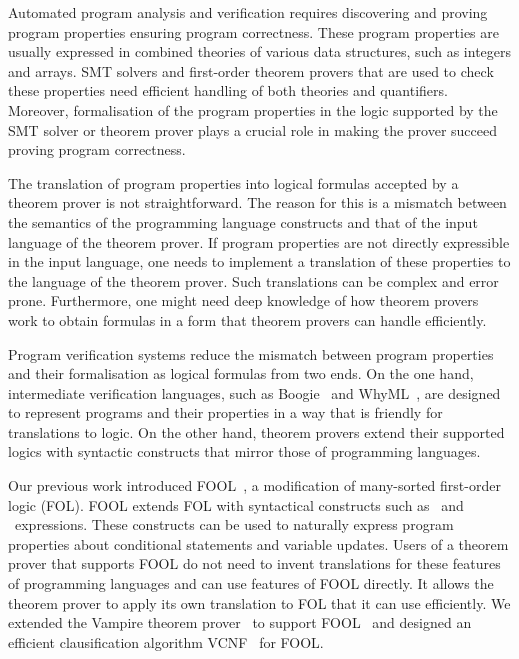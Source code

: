 
Automated program analysis and verification requires discovering and proving program properties ensuring program correctness. 
 These program properties are usually expressed in combined theories of various data structures, such as integers and arrays. 
SMT solvers and first-order theorem provers that are used to check these properties need efficient handling of both theories and quantifiers. Moreover, 
formalisation of the program properties in the logic supported by the SMT solver or theorem prover plays a crucial role in making the prover succeed proving program correctness. 

The translation of program properties into logical formulas accepted by a theorem prover is not straightforward. The reason for this is a mismatch between the semantics of the programming language constructs and that of the input language of the theorem prover. If program properties are not directly expressible in the input language, one needs to implement a translation of these properties to the language of the theorem prover. Such translations can be complex and error prone. Furthermore, one might need deep knowledge of how theorem provers work to obtain formulas in a form that theorem provers can handle efficiently.

Program verification systems reduce the mismatch between program properties and their formalisation as logical formulas from two ends. On the one hand, intermediate verification languages, such as Boogie~\cite{leino2008boogie} and WhyML~\cite{DBLP:conf/esop/FilliatreP13}, are designed to represent programs and their properties in a way that is friendly for translations to logic. On the other hand, theorem provers extend their supported logics with syntactic constructs that mirror those of programming languages.

Our previous work introduced FOOL~\cite{FOOL}, a modification of many-sorted first-order logic (FOL). FOOL extends FOL with syntactical constructs such as \ITE\ and \LETIN\ expressions. These constructs can be used to naturally express program properties about conditional statements and variable updates. Users of a theorem prover that supports FOOL do not need to invent translations for these features of programming languages and can use features of FOOL directly. It allows the theorem prover to apply its own translation to FOL that it can use efficiently. We extended the Vampire theorem prover~\cite{Vampire13} to support FOOL~\cite{VampireAndFOOL} and designed an efficient clausification algorithm VCNF~\cite{FOOLCNF} for FOOL.

